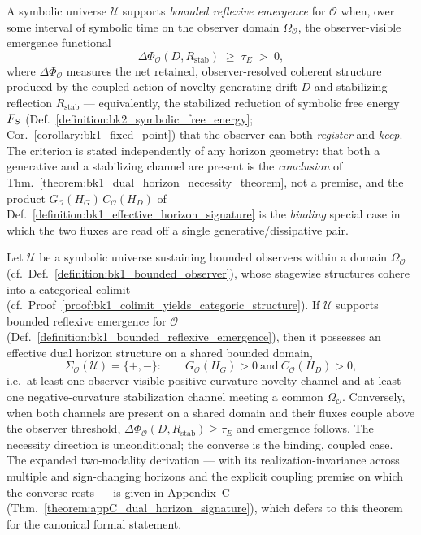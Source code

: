 \begin{definition}
\label{definition:bk1_bounded_reflexive_emergence}
A symbolic universe \(\mathcal{U}\) supports \emph{bounded reflexive emergence}
for \(\mathcal{O}\) when, over some interval of symbolic time on the observer
domain \(\Omega_{\mathcal{O}}\), the observer-visible emergence functional
\[
\Delta\Phi_{\mathcal{O}}(D,R_{\mathrm{stab}}) \;\ge\; \tau_E \;>\; 0,
\]
where \(\Delta\Phi_{\mathcal{O}}\) measures the net retained, observer-resolved
coherent structure produced by the coupled action of novelty-generating drift
\(D\) and stabilizing reflection \(R_{\mathrm{stab}}\) --- equivalently, the
stabilized reduction of symbolic free energy \(F_S\)
(Def.~\ref{definition:bk2_symbolic_free_energy};
Cor.~\ref{corollary:bk1_fixed_point}) that the observer can both \emph{register}
and \emph{keep}. The criterion is stated independently of any horizon geometry:
that both a generative and a stabilizing channel are present is the
\emph{conclusion} of Thm.~\ref{theorem:bk1_dual_horizon_necessity_theorem}, not a
premise, and the product \(G_{\mathcal{O}}(H_G)\,C_{\mathcal{O}}(H_D)\) of
Def.~\ref{definition:bk1_effective_horizon_signature} is the \emph{binding}
special case in which the two fluxes are read off a single
generative/dissipative pair.
\end{definition}

\begin{theorem}
\label{theorem:bk1_dual_horizon_necessity_theorem}
Let $\mathcal{U}$ be a symbolic universe sustaining bounded observers within a
domain $\Omega_{\mathcal{O}}$ (cf.~Def.~\ref{definition:bk1_bounded_observer}),
whose stagewise structures cohere into a categorical colimit
(cf.~Proof~\ref{proof:bk1_colimit_yields_categoric_structure}). If \(\mathcal{U}\)
supports bounded reflexive emergence for \(\mathcal{O}\)
(Def.~\ref{definition:bk1_bounded_reflexive_emergence}), then it possesses an
effective dual horizon structure on a shared bounded domain,
\[
\Sigma_{\mathcal{O}}(\mathcal{U})=\{+,-\}:
\qquad G_{\mathcal{O}}(H_G)>0 \ \text{and}\ C_{\mathcal{O}}(H_D)>0,
\]
i.e.\ at least one observer-visible positive-curvature novelty channel and at
least one negative-curvature stabilization channel meeting a common
\(\Omega_{\mathcal{O}}\). Conversely, when both channels are present on a shared
domain and their fluxes couple above the observer threshold,
\(\Delta\Phi_{\mathcal{O}}(D,R_{\mathrm{stab}})\ge\tau_E\) and emergence follows.
The necessity direction is unconditional; the converse is the binding, coupled
case. The expanded two-modality derivation --- with its realization-invariance
across multiple and sign-changing horizons and the explicit coupling premise on
which the converse rests --- is given in Appendix~C
(Thm.~\ref{theorem:appC_dual_horizon_signature}), which defers to this theorem
for the canonical formal statement.
\end{theorem}

